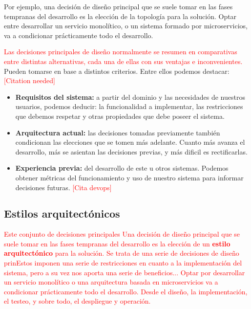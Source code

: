 Por ejemplo, una decisión de diseño principal que se suele tomar en las fases tempranas del desarrollo es la elección de la topología para la solución. Optar entre desarrollar un servicio monolítico, o un sistema formado por microservicios, va a condicionar prácticamente todo el desarrollo.

\textcolor{red}{Las decisiones principales de diseño normalmente se resumen en comparativas entre distintas alternativas, cada una de ellas con sus ventajas e inconvenientes.} Pueden tomarse en base a distintos criterios. Entre ellos podemos destacar: \textcolor{red}{[Citation needed]}

    \begin{itemize}
        \item \textbf{Requisitos del sistema:} a partir del dominio y las necesidades de nuestros usuarios, podemos deducir: la funcionalidad a implementar, las restricciones que debemos respetar y otras propiedades que debe poseer el sistema.

        \item \textbf{Arquitectura actual:} las decisiones tomadas previamente también condicionan las elecciones que se tomen más adelante. Cuanto más avanza el desarrollo, más se asientan las decisiones previas, y más dificil es rectificarlas.

        \item \textbf{Experiencia previa:} del desarrollo de este u otros sistemas. Podemos obtener métricas del funcionamiento y uso de nuestro sistema para informar decisiones futuras. \textcolor{red}{[Cita devops]}
    \end{itemize}

\subsection{Estilos arquitectónicos}

\textcolor{red}{Este conjunto de decisiones principales Una decisión de diseño principal que se suele tomar en las fases tempranas del desarrollo es la elección de un \textbf{estilo arquitectónico} para la solución. Se trata de una serie de decisiones de diseño prinEstos imponen una serie de restricciones en cuanto a la implementación del sistema, pero a su vez nos aporta una serie de beneficios... Optar por desarrollar un servicio monolítico o una arquitectura basada en microservicios va a condicionar prácticamente todo el desarrollo. Desde el diseño, la implementación, el testeo, y sobre todo, el despliegue y operación.}

